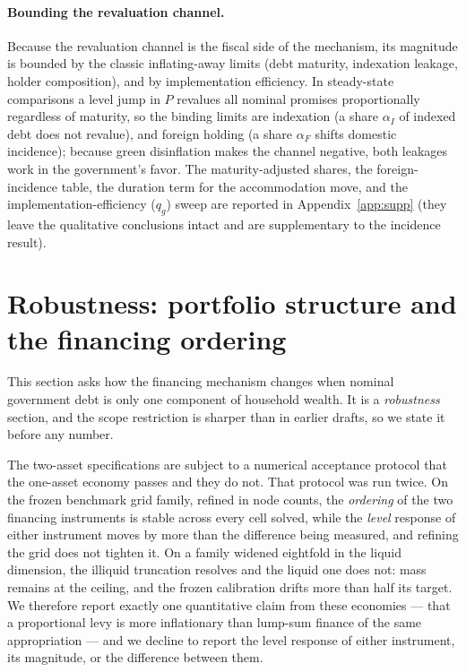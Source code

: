 \documentclass[12pt]{article}
\makeatletter
\newcommand{\FloatBarrier}{\par
    \begingroup\let\@elt\relax
    \edef\reserved@a{\@deferlist}\endgroup
    \ifx\reserved@a\@empty\else\clearpage\fi}
\makeatother
\begin{document}
\FloatBarrier
\paragraph{Bounding the revaluation channel.} Because the revaluation channel
is the fiscal side of the mechanism, its magnitude is bounded by the classic
inflating-away limits (debt maturity, indexation leakage, holder composition), and by implementation efficiency. In steady-state comparisons a level jump
in $P$ revalues all nominal promises proportionally regardless of maturity, so
the binding limits are indexation (a share $\alpha_I$ of indexed debt does not
revalue), and foreign holding (a share $\alpha_F$ shifts domestic incidence);
because green disinflation makes the channel negative, both leakages work
in the government's favor. The maturity-adjusted shares, the foreign-incidence
table, the duration term for the accommodation move, and the
implementation-efficiency ($q_g$) sweep are reported in
Appendix~\ref{app:supp} (they leave the qualitative conclusions intact and are
supplementary to the incidence result).

\FloatBarrier
\section{Robustness: portfolio structure and the financing ordering}\label{subsec:twoassetnl}

This section asks how the financing mechanism changes when nominal government debt is only one
component of household wealth. It is a \emph{robustness} section, and the scope restriction is
sharper than in earlier drafts, so we state it before any number.

The two-asset specifications are subject to a numerical acceptance protocol that the one-asset
economy passes and they do not. That protocol was run twice. On the frozen benchmark grid family,
refined in node counts, the \emph{ordering} of the two financing instruments is stable across every
cell solved, while the \emph{level} response of either instrument moves by more than the difference
being measured, and refining the grid does not tighten it. On a family widened eightfold in the
liquid dimension, the illiquid truncation resolves and the liquid one does not: mass remains at the
ceiling, and the frozen calibration drifts more than half its target. We therefore report exactly
one quantitative claim from these economies --- that a proportional levy is more inflationary than
lump-sum finance of the same appropriation --- and we decline to report the level response of
either instrument, its magnitude, or the difference between them.
\end{document}
